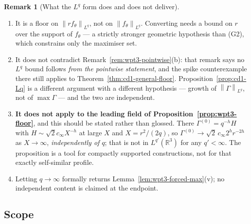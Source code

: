 \documentclass[11pt]{article}
\theoremstyle{definition}
\newtheorem{remark}[theorem]{Remark}
\theoremstyle{remark}
\newcommand{\R}{\mathbb{R}}
\newcommand{\norm}[1]{\left\|#1\right\|}
\begin{document}
\begin{remark}[What the $L^q$ form does and does not deliver]
  \label{rem:cd1-Lq-scope}
  \begin{enumerate}[label=(\alph*),leftmargin=2.2em]
    \item It is a floor on $\norm{rf_\theta}_{L^q}$, not on
      $\norm{f_\theta}_{L^q}$. Converting needs a bound on $r$ over the
      support of $f_\theta$ --- a strictly stronger geometric hypothesis than
      (G2), which constrains only the maximiser set.
    \item It does not contradict Remark~\ref{rem:wpt3-pointwise}(b): that
      remark says no $L^q$ bound follows \emph{from the pointwise statement},
      and the spike counterexample there still applies to
      Theorem~\ref{thm:cd1-general-floor}. Proposition~\ref{prop:cd1-Lq} is a
      different argument with a different hypothesis --- growth of
      $\norm\Gamma_{L^q}$, not of $\max\Gamma$ --- and the two are
      independent.
    \item \textbf{It does not apply to the leading field of
      Proposition~\ref{prop:wpt3-floor}}, and this should be stated rather
      than glossed. There $\Gamma^{(0)}=q^{-h}H$ with
      $H\sim\sqrt2c_\infty X^{-h}$ at large $X$ and $X=r^2/(2q)$, so
      $\Gamma^{(0)}\to\sqrt2\,c_\infty2^{h}r^{-2h}$ as $X\to\infty$,
      \emph{independently of $q$}; that is not in $L^{q'}(\R^3)$ for any
      $q'<\infty$. The proposition is a tool for compactly supported
      constructions, not for that exactly self-similar profile.
    \item Letting $q\to\infty$ formally returns
      Lemma~\ref{lem:wpt3-forced-max}(v); no independent content is claimed
      at the endpoint.
  \end{enumerate}
\end{remark}

\subsection{Scope}
\label{subsec:cd1-scope}
\end{document}
